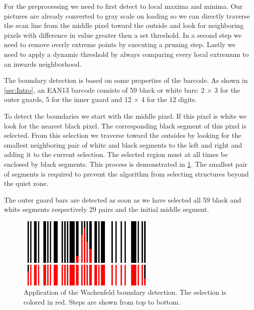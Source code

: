 For the preprocessing we need to first detect to local maxima and minima. Our pictures are already converted to gray scale on loading so we can directly traverse the scan line from the middle pixel toward the outside and look for neighboring pixels with difference in value greater then a set threshold. In a second step we need to remove overly extreme points by executing a pruning step. Lastly we need to apply a dynamic threshold by always comparing every local extremum to an inwards neighborhood.

The boundary detection is based on some properties of the barcode. As shown in
\cref{sec:Intro}, an EAN13 barcode consists of 59 black or white bars: 2 $\times$ 3 for the outer guards, 5 for the inner guard and 12 $\times$ 4 for the 12 digits.

To detect the boundaries we start with the middle pixel. If this pixel is white
we look for the nearest black pixel. The corresponding black segment of this
pixel is selected. From this selection we traverse toward the outsides by
looking for the smallest neighboring pair of white and black segments to the
left and right and adding it to the current selection. The selected region must
at all times be enclosed by black segments. This process is demonstrated in
\cref{wachenfeld}. The smallest pair of segments is required to prevent the
algorithm from selecting structures beyond the quiet zone.

The outer guard bars are detected as soon as we have selected all 59 black and white segments respectively 29 pairs and the initial middle segment.

\begin{figure}[t]
\center
\includegraphics[width=0.6\textwidth,natwidth=900,natheight=463]{img/wachenfeld.png}
\caption{Application of the Wachenfeld boundary detection. The selection is colored in red. Steps are shown from top to bottom.}
\label{wachenfeld}
\end{figure}


